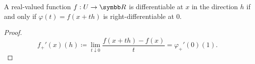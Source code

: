 \begin{proposition}\label{thm:real_valued_differentiability}
  A real-valued function \( f: U \to \R \) is differentiable at \( x \) in the direction \( h \) if and only if \( \varphi(t) = f(x + th) \) is right-differentiable at \( 0 \).
\end{proposition}
\begin{proof}
  \begin{equation*}
    f_+'(x)(h) \coloneqq \lim_{t \downarrow 0} \frac {f(x + th) - f(x)} t = \varphi_+'(0)(1).
  \end{equation*}
\end{proof}
